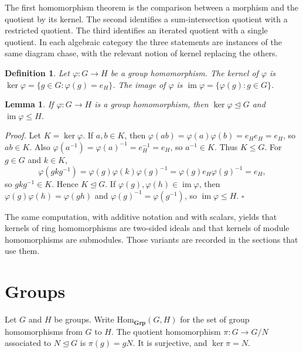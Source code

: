 \documentclass[11pt,letterpaper]{article}
\newcommand{\Map}[3]{#1 \colon #2 \to #3}
\newcommand{\GroupHom}{\mathrm{Hom}_{\mathbf{Grp}}}
\newtheorem{lemma}[theorem]{Lemma}
\newtheorem{definition}[theorem]{Definition}
\newenvironment{proof}{\noindent\textit{Proof.}}{\hfill\(\square\)}
\begin{document}
The first homomorphism theorem is the comparison between a morphism and the quotient by its kernel. The second identifies a sum-intersection quotient with a restricted quotient. The third identifies an iterated quotient with a single quotient. In each algebraic category the three statements are instances of the same diagram chase, with the relevant notion of kernel replacing the others.

\begin{definition}
Let \(\Map{\varphi}{G}{H}\) be a group homomorphism. The \emph{kernel} of \(\varphi\) is \(\ker\varphi=\{g\in G:\varphi(g)=e_H\}\). The \emph{image} of \(\varphi\) is \(\operatorname{im}\varphi=\{\varphi(g):g\in G\}\).
\end{definition}

\begin{lemma}
\label{lem:kernel-normal}
If \(\Map{\varphi}{G}{H}\) is a group homomorphism, then \(\ker\varphi\trianglelefteq G\) and \(\operatorname{im}\varphi\leq H\).
\end{lemma}

\begin{proof}
Let \(K=\ker\varphi\). If \(a,b\in K\), then \(\varphi(ab)=\varphi(a)\varphi(b)=e_H e_H=e_H\), so \(ab\in K\). Also \(\varphi(a^{-1})=\varphi(a)^{-1}=e_H^{-1}=e_H\), so \(a^{-1}\in K\). Thus \(K\leq G\). For \(g\in G\) and \(k\in K\),
\[
\varphi(gkg^{-1})=\varphi(g)\varphi(k)\varphi(g)^{-1}=\varphi(g)e_H\varphi(g)^{-1}=e_H,
\]
so \(gkg^{-1}\in K\). Hence \(K\trianglelefteq G\). If \(\varphi(g),\varphi(h)\in\operatorname{im}\varphi\), then \(\varphi(g)\varphi(h)=\varphi(gh)\) and \(\varphi(g)^{-1}=\varphi(g^{-1})\), so \(\operatorname{im}\varphi\leq H\).
\end{proof}

The same computation, with additive notation and with scalars, yields that kernels of ring homomorphisms are two-sided ideals and that kernels of module homomorphisms are submodules. Those variants are recorded in the sections that use them.

\section{Groups}

Let \(G\) and \(H\) be groups. Write \(\GroupHom(G,H)\) for the set of group homomorphisms from \(G\) to \(H\). The quotient homomorphism \(\Map{\pi}{G}{G/N}\) associated to \(N\trianglelefteq G\) is \(\pi(g)=gN\). It is surjective, and \(\ker\pi=N\).
\end{document}
